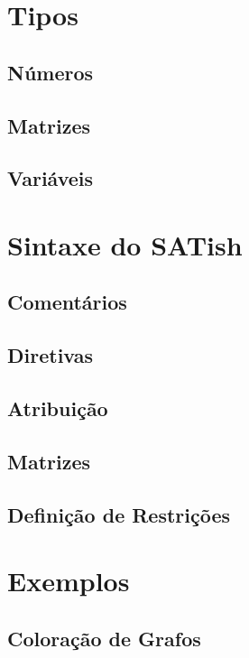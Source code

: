 \documentclass[12pt]{satyrus}
\begin{document}
    \chapter{Tipos}
    
    \section{Números}
    
    \section{Matrizes}
    
    \section{Variáveis}
    
    \chapter{Sintaxe do SATish}
    
    \section{Comentários}
    
    \section{Diretivas}
    
    \section{Atribuição}
    
    \section{Matrizes}
    
    \section{Definição de Restrições}
    
    \chapter{Exemplos}
    
    \section{Coloração de Grafos}
    
\end{document}
